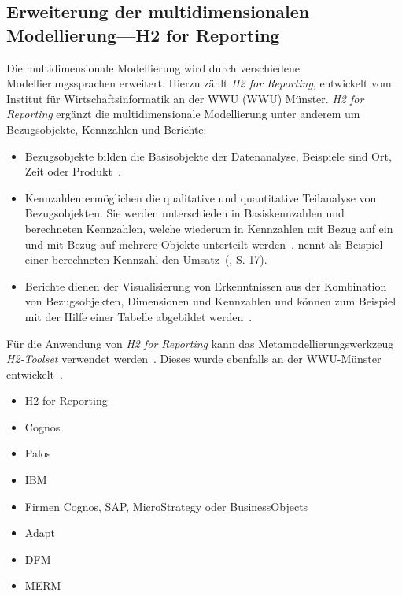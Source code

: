 \documentclass[
  language=german, %
  type=bachelor%
]{isthesis}
\begin{document}
\begin{content}
  \section{Erweiterung der multidimensionalen Modellierung---H2 for Reporting}
  Die multidimensionale Modellierung wird durch verschiedene Modellierungssprachen
  erweitert. Hierzu zählt \zB{} \textit{H2 for Reporting}, entwickelt vom
  Institut für Wirtschaftsinformatik an der \acrlong{WWU} (WWU)
  Münster. \textit{H2 for Reporting}
  ergänzt die multidimensionale Modellierung unter anderem um Bezugsobjekte,
  Kennzahlen und Berichte:
  \begin{itemize}
    \item Bezugsobjekte bilden die
      Basisobjekte der Datenanalyse, Beispiele sind Ort, Zeit oder
      Produkt~\cite[][S.  5]{becker2007h2}.

    \item Kennzahlen ermöglichen die qualitative
      und quantitative Teilanalyse von Bezugsobjekten. Sie werden unterschieden in
      Basiskennzahlen und berechneten Kennzahlen, welche wiederum in Kennzahlen mit
      Bezug auf ein und mit Bezug auf mehrere Objekte unterteilt werden~\cite[][S.
      15]{becker2007h2}. \textsc{\citeauthor{becker2007h2}} nennt als Beispiel
      einer berechneten Kennzahl den Umsatz~(\cite{becker2007h2}, S. 17).

    \item Berichte dienen der Visualisierung von Erkenntnissen aus der Kombination von
      Bezugsobjekten, Dimensionen und Kennzahlen und können zum Beispiel mit der
      Hilfe einer Tabelle abgebildet werden~\cite[][S. 23]{becker2007h2}.
  \end{itemize}

  Für die Anwendung von \textit{H2 for Reporting} kann das
  Metamodellierungswerkzeug \textit{H2-Toolset} verwendet werden~\cite[][S.
  33]{fleischer2013konstruktion}. Dieses wurde ebenfalls an der
  \acrshort{WWU}-Münster entwickelt~\cite[][S. 34]{becker2007h2}.

  \begin{itemize}
    \item H2 for Reporting
    \item Cognos
    \item Palos
    \item IBM
    \item Firmen Cognos, SAP, MicroStrategy oder BusinessObjects
    \item Adapt
    \item DFM
    \item MERM
  \end{itemize}


\end{content}
\end{document}
